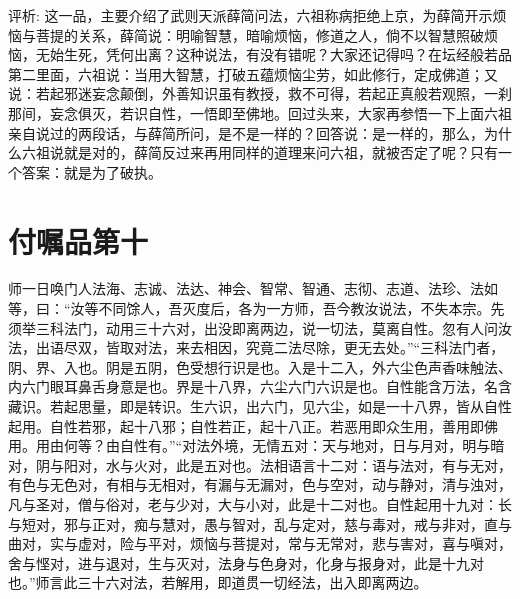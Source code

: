 \documentclass[12pt,twoside,openany]{book}
\newcommand{\kai}[1]{{\CJKfamily{kai}#1}}
\begin{document}
\kai{评析: 这一品，主要介绍了武则天派薛简问法，六祖称病拒绝上京，为薛简开示烦恼与菩提的关系，薛简说：明喻智慧，暗喻烦恼，修道之人，倘不以智慧照破烦恼，无始生死，凭何出离？这种说法，有没有错呢？大家还记得吗？在坛经般若品第二里面，六祖说：当用大智慧，打破五蕴烦恼尘劳，如此修行，定成佛道；又说：若起邪迷妄念颠倒，外善知识虽有教授，救不可得，若起正真般若观照，一刹那间，妄念俱灭，若识自性，一悟即至佛地。回过头来，大家再参悟一下上面六祖亲自说过的两段话，与薛简所问，是不是一样的？回答说：是一样的，那么，为什么六祖说就是对的，薛简反过来再用同样的道理来问六祖，就被否定了呢？只有一个答案：就是为了破执。}

\chapter{付嘱品第十}
师一日唤门人法海、志诚、法达、神会、智常、智通、志彻、志道、法珍、法如等，曰：“汝等不同馀人，吾灭度后，各为一方师，吾今教汝说法，不失本宗。先须举三科法门，动用三十六对，出没即离两边，说一切法，莫离自性。忽有人问汝法，出语尽双，皆取对法，来去相因，究竟二法尽除，更无去处。”“三科法门者，阴、界、入也。阴是五阴，色受想行识是也。入是十二入，外六尘色声香味触法、内六门眼耳鼻舌身意是也。界是十八界，六尘六门六识是也。自性能含万法，名含藏识。若起思量，即是转识。生六识，出六门，见六尘，如是一十八界，皆从自性起用。自性若邪，起十八邪；自性若正，起十八正。若恶用即众生用，善用即佛用。用由何等？由自性有。”“对法外境，无情五对：天与地对，日与月对，明与暗对，阴与阳对，水与火对，此是五对也。法相语言十二对：语与法对，有与无对，有色与无色对，有相与无相对，有漏与无漏对，色与空对，动与静对，清与浊对，凡与圣对，僧与俗对，老与少对，大与小对，此是十二对也。自性起用十九对：长与短对，邪与正对，痴与慧对，愚与智对，乱与定对，慈与毒对，戒与非对，直与曲对，实与虚对，险与平对，烦恼与菩提对，常与无常对，悲与害对，喜与嗔对，舍与悭对，进与退对，生与灭对，法身与色身对，化身与报身对，此是十九对也。”师言此三十六对法，若解用，即道贯一切经法，出入即离两边。
\end{document}
